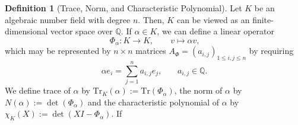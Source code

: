 \documentclass[a4paper]{book}
\theoremstyle{definition}
\newtheorem{definition}{Definition}[]
\begin{document}
\begin{defbox}
    \begin{definition}[Trace, Norm, and Characteristic Polynomial]
        Let \(K\) be an algebraic number field with degree \(n\). Then, \(K\) can be viewed as an finite-dimensional vector space over \(\mathbb{Q}\). If \(\alpha \in K\), we can define a linear operator
        \begin{equation*}
            \Phi_\alpha: K \longrightarrow K, \qquad v \mapsto \alpha v \text{,}
        \end{equation*}
        which may be represented by \(n \times n\) matrices \(A_\Phi = (a_{i, j})_{1 \leq i, j \leq n}\) by requiring
        \begin{equation*}
            \alpha e_i = \sum_{j=1}^n a_{i, j} e_j\text{,} \qquad a_{i, j} \in \mathbb{Q} \text{.}
        \end{equation*}
        We define trace of \(\alpha\) by \(\mathrm{Tr}_K(\alpha) := \mathrm{Tr}(\Phi_\alpha)\), the norm of \(\alpha\) by \(N(\alpha) := \det(\Phi_\alpha)\) and the characteristic polynomial of \(\alpha\) by \(\chi_K(X) := \det(XI - \Phi_\alpha)\). If 
    \end{definition}
\end{defbox}
\end{document}
